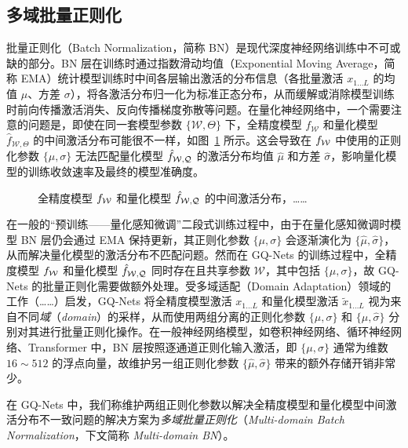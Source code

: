 \subsection{多域批量正则化}
批量正则化（Batch Normalization，简称 BN）是现代深度神经网络训练中不可或缺的部分。BN 层在训练时通过指数滑动均值（Exponential Moving Average，简称 EMA）统计模型训练时中间各层输出激活的分布信息（各批量激活 $x_{1\ldots L}$ 的均值 $\mu$、方差 $\sigma$），将各激活分布归一化为标准正态分布，从而缓解或消除模型训练时前向传播激活消失、反向传播梯度弥散等问题。在量化神经网络中，一个需要注意的问题是，即使在同一套模型参数 $\{\mathcal{W}, \Theta\}$ 下，全精度模型 $f_{\mathcal{W}}$ 和量化模型 $\hat{f}_{\mathcal{W}, \Theta}$ 的中间激活分布可能很不一样，如图~\ref{img::gq_nets::fp_q_act_dist} 所示。这会导致在 $f_{\mathcal{W}}$ 中使用的正则化参数 $\{\mu, \sigma\}$ 无法匹配量化模型 $\hat{f}_{\mathcal{W, Q}}$ 的激活分布均值 $\hat{\mu}$ 和方差 $\hat{\sigma}$，影响量化模型的训练收敛速率及最终的模型准确度。

\begin{figure}[htb]
  \centering
  \caption{全精度模型 $f_{\mathcal{W}}$ 和量化模型 $\hat{f}_{\mathcal{W, Q}}$ 的中间激活分布，……}
  \label{img::gq_nets::fp_q_act_dist}
\end{figure}

在一般的“预训练——量化感知微调”二段式训练过程中，由于在量化感知微调时模型 BN 层仍会通过 EMA 保持更新，其正则化参数 $\{\mu, \sigma\}$ 会逐渐演化为 $\{\hat{\mu}, \hat{\sigma}\}$，从而解决量化模型的激活分布不匹配问题。然而在 GQ-Nets 的训练过程中，全精度模型 $f_{\mathcal{W}}$ 和量化模型 $\hat{f}_{\mathcal{W, Q}}$ 同时存在且共享参数 $\mathcal{W}$，其中包括 $\{\mu, \sigma\}$，故 GQ-Nets 的批量正则化需要做额外处理。受多域适配（Domain Adaptation）领域的工作（……）启发，GQ-Nets 将全精度模型激活 $x_{1\ldots L}$ 和量化模型激活 $\tilde{x}_{1\ldots L}$ 视为来自不同\emph{域}（\emph{domain}）的采样，从而使用两组分离的正则化参数 $\{\mu, \sigma\}$ 和 $\{\hat{\mu}, \hat{\sigma}\}$ 分别对其进行批量正则化操作。在一般神经网络模型，如卷积神经网络、循环神经网络、Transformer 中，BN 层按照逐通道正则化输入激活，即 $\{\mu, \sigma\}$ 通常为维数 $16\sim 512$ 的浮点向量，故维护另一组正则化参数 $\{\hat{\mu}, \hat{\sigma}\}$ 带来的额外存储开销非常少。

在 GQ-Nets 中，我们称维护两组正则化参数以解决全精度模型和量化模型中间激活分布不一致问题的解决方案为\emph{多域批量正则化}（\emph{Multi-domain Batch Normalization}，下文简称 \emph{Multi-domain BN}）。
